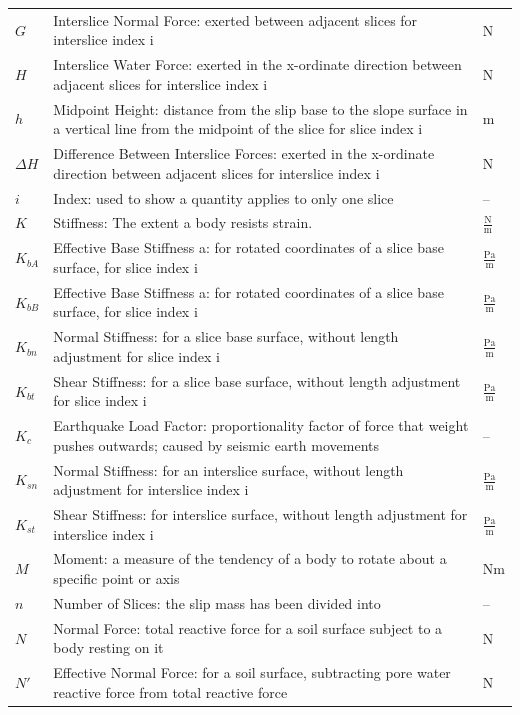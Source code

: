 \documentclass[12pt]{article}
\begin{document}
\begin{longtabu}{l X[l] l}
\\
$G$ & Interslice Normal Force: exerted between adjacent slices for interslice index i & N
\\
$H$ & Interslice Water Force: exerted in the x-ordinate direction between adjacent slices for interslice index i & N
\\
$h$ & Midpoint Height: distance from the slip base to the slope surface in a vertical line from the midpoint of the slice for slice index i & m
\\
$ΔH$ & Difference Between Interslice Forces: exerted in the x-ordinate direction between adjacent slices for interslice index i & N
\\
$i$ & Index: used to show a quantity applies to only one slice & --
\\
$K$ & Stiffness: The extent a body resists strain. & $\frac{\text{N}}{\text{m}}$
\\
${K_{bA}}$ & Effective Base Stiffness a: for rotated coordinates of a slice base surface, for slice index i & $\frac{\text{Pa}}{\text{m}}$
\\
${K_{bB}}$ & Effective Base Stiffness a: for rotated coordinates of a slice base surface, for slice index i & $\frac{\text{Pa}}{\text{m}}$
\\
${K_{bn}}$ & Normal Stiffness: for a slice base surface, without length adjustment for slice index i & $\frac{\text{Pa}}{\text{m}}$
\\
${K_{bt}}$ & Shear Stiffness: for a slice base surface, without length adjustment for slice index i & $\frac{\text{Pa}}{\text{m}}$
\\
${K_{c}}$ & Earthquake Load Factor: proportionality factor of force that weight pushes outwards; caused by seismic earth movements & --
\\
${K_{sn}}$ & Normal Stiffness: for an interslice surface, without length adjustment for interslice index i & $\frac{\text{Pa}}{\text{m}}$
\\
${K_{st}}$ & Shear Stiffness: for interslice surface, without length adjustment for interslice index i & $\frac{\text{Pa}}{\text{m}}$
\\
$M$ & Moment: a measure of the tendency of a body to rotate about a specific point or axis & Nm
\\
$n$ & Number of Slices: the slip mass has been divided into & --
\\
$N$ & Normal Force: total reactive force for a soil surface subject to a body resting on it & N
\\
$N'$ & Effective Normal Force: for a soil surface, subtracting pore water reactive force from total reactive force & N

\end{longtabu}
\end{document}
